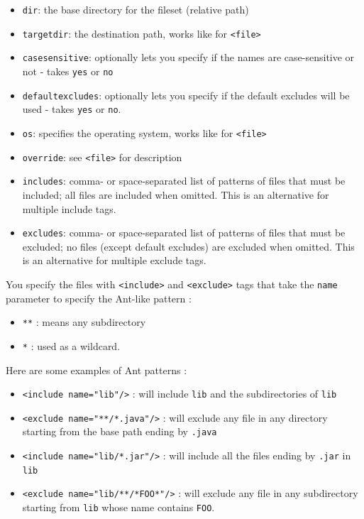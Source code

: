 \begin{itemize}

  \item \texttt{dir}: the base directory for the fileset (relative path)

  \item \texttt{targetdir}: the destination path, works like for
  \texttt{<file>}

  \item \texttt{casesensitive}: optionally lets you specify if the names
  are case-sensitive or not - takes \texttt{yes} or \texttt{no}

  \item \texttt{defaultexcludes}: optionally lets you specify if the default
  excludes will be used - takes \texttt{yes} or \texttt{no}.

  \item \texttt{os}: specifies the operating system, works like for
  \texttt{<file>}

  \item \texttt{override}: see \texttt{<file>} for description

  \item \texttt{includes}: comma- or space-separated list of patterns of
  files that must be included; all files are included when omitted.
  This is an alternative for multiple include tags.

  \item \texttt{excludes}: comma- or space-separated list of patterns of
  files that must be excluded; no files (except default excludes) are
  excluded when omitted. This is an alternative for multiple exclude tags.

\end{itemize}

You specify the files with  \texttt{<include>} and \texttt{<exclude>} tags
that take the \texttt{name} parameter to specify the Ant-like pattern :
\begin{itemize}    
  \item \texttt{**} : means any subdirectory
  \item \texttt{*} : used as a wildcard.
\end{itemize}
Here are some examples of Ant patterns :
\begin{itemize}

  \item \texttt{<include name="lib"/>} : will include \texttt{lib} and the
  subdirectories of \texttt{lib}

  \item \texttt{<exclude name="**/*.java"/>} : will exclude any file in any
  directory starting from the base path ending by \texttt{.java}

  \item \texttt{<include name="lib/*.jar"/>} : will include all the files
  ending by \texttt{.jar} in \texttt{lib}

  \item \texttt{<exclude name="lib/**/*FOO*"/>} : will exclude any file in
  any subdirectory starting from \texttt{lib} whose name contains
  \texttt{FOO}.

\end{itemize}

